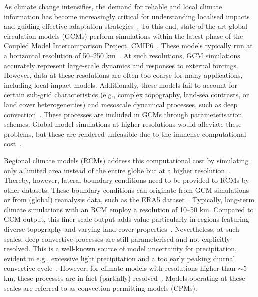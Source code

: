 \documentclass[journal abbreviation, manuscript]{copernicus}
\begin{document}
As climate change intensifies, the demand for reliable and local climate information has become increasingly critical for understanding localised impacts and guiding effective adaptation strategies~\citep{IPCC_AR6_ch12}.
To this end, state-of-the-art global circulation models (GCMs) perform simulations within the latest phase of the Coupled Model Intercomparison Project, CMIP6~\citep{eyring_overview_2016}. 
These models typically run at a horizontal resolution of 50--250 km~\citep{nguyen_selecting_2024, IPCC_AR6_WG1_ANNEX2, IPCC_AR6_ch1}.
At such resolutions, GCM simulations accurately represent large-scale dynamics and responses to external forcings.
However, data at these resolutions are often too coarse for many applications, including local impact models.
Additionally, these models fail to account for certain sub-grid characteristics (e.g., complex topography, land-sea contrasts, or land cover heterogeneities) and mesoscale dynamical processes, such as deep convection~\citep{rummukainen_added_2016, giorgi_thirty_2019, lucas-picher_convection-permitting_2021}.
These processes are included in GCMs through parameterisation schemes.
Global model simulations at higher resolutions would alleviate these problems, but these are rendered unfeasible due to the immense computational cost~\citep{fuhrer_near-global_2018}.

Regional climate models (RCMs) address this computational cost by simulating only a limited area instead of the entire globe but at a higher resolution~\citep{giorgi_thirty_2019}.
Thereby, however, lateral boundary conditions need to be provided to RCMs by other datasets. 
These boundary conditions can originate from GCM simulations or from (global) reanalysis data, such as the ERA5 dataset~\citep{hersbach_era5_2020}.
Typically, long-term climate simulations with an RCM employ a resolution of 10--50 km.
Compared to GCM output, this finer-scale output adds value particularly in regions featuring diverse topography and varying land-cover properties~\citep{rummukainen_added_2016, IPCC_AR6_ch10}.
Nevertheless, at such scales, deep convective processes are still parameterised and not explicitly resolved. 
This is a well-known source of model uncertainty for precipitation, evident in e.g., excessive light precipitation and a too early peaking diurnal convective cycle~\citep{ban_evaluation_2014,fosser_benefit_2015, hohenegger_towards_2008, kendon_realism_2012,vergara-temprado_climate_2020}.
However, for climate models with resolutions higher than $\sim 5$ km, these processes are in fact (partially) resolved~\citep{prein_review_2015, lucas-picher_convection-permitting_2021}.
Models operating at these scales are referred to as convection-permitting models (CPMs).
\end{document}
